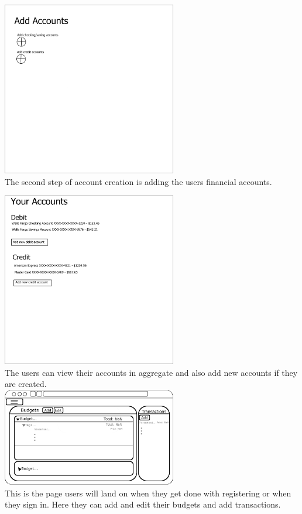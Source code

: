 \documentclass[12pt]{article}
\begin{document}
\includegraphics[width=3in]{first_time_add_bank_accounts.jpg}\\
The second step of account creation is adding the users financial accounts.

\includegraphics[width=3in]{your_accounts_page.jpg}\\
The users can view their accounts in aggregate and also add new accounts if they are created.\\

\includegraphics[width=3in]{BudgetPage.png}\\
This is the page users will land on when they get done with registering or when they sign in. Here they can add and edit their budgets and add transactions.\\
\end{document}
